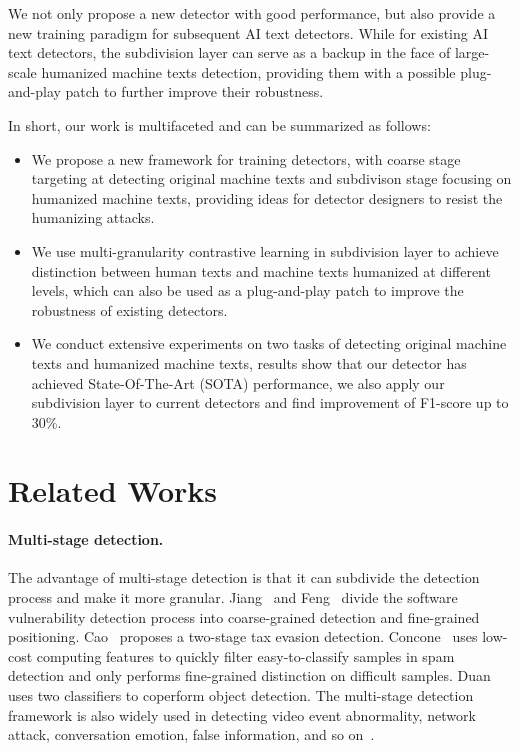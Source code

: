 \documentclass[11pt]{article}
\newcommand{\greenCite}[1]{\textcolor{darkgreen}{\cite{#1}}}
\begin{document}
	We not only propose a new detector with good performance, but also provide a new training paradigm for subsequent AI text detectors. While for existing AI text detectors, the subdivision layer can serve as a backup in the face of large-scale humanized machine texts detection, providing them with a possible plug-and-play patch to further improve their robustness.
	
	In short, our work is multifaceted and can be summarized as follows:
	\begin{itemize}
		\item We propose a new framework for training detectors, with coarse stage targeting at detecting original machine texts and subdivison stage focusing on humanized machine texts, providing ideas for detector designers to resist the humanizing attacks.
		\item We use multi-granularity contrastive learning in subdivision layer to achieve distinction between human texts and machine texts humanized at different levels, which can also be used as a plug-and-play patch to improve the robustness of existing detectors.
		\item We conduct extensive experiments on two tasks of detecting original machine texts and humanized machine texts, results show that our detector has achieved State-Of-The-Art (SOTA) performance, we also apply our subdivision layer to current detectors and find improvement of F1-score up to 30\%.
	\end{itemize}

	\section{Related Works}
	\paragraph{Multi-stage detection.}
	The advantage of multi-stage detection is that it can subdivide the detection process and make it more granular. Jiang~\greenCite{jiang2024Staged} and Feng~\greenCite{siyue2024fire} divide the software vulnerability detection process into coarse-grained detection and fine-grained positioning. Cao~\greenCite{Cao2024RRPU} proposes a two-stage tax evasion detection. Concone~\greenCite{Concone2023SpADe} uses low-cost computing features to quickly filter easy-to-classify samples in spam detection and only performs fine-grained distinction on difficult samples. Duan~\greenCite{duan2020corner} uses two classifiers to coperform object detection. The multi-stage detection framework is also widely used in detecting video event abnormality, network attack, conversation emotion, false information, and so on~\greenCite{wang2018videoabnormal,wang2025network,li2024emotion,lin2024machine,li2021cloud}.
	
\end{document}
